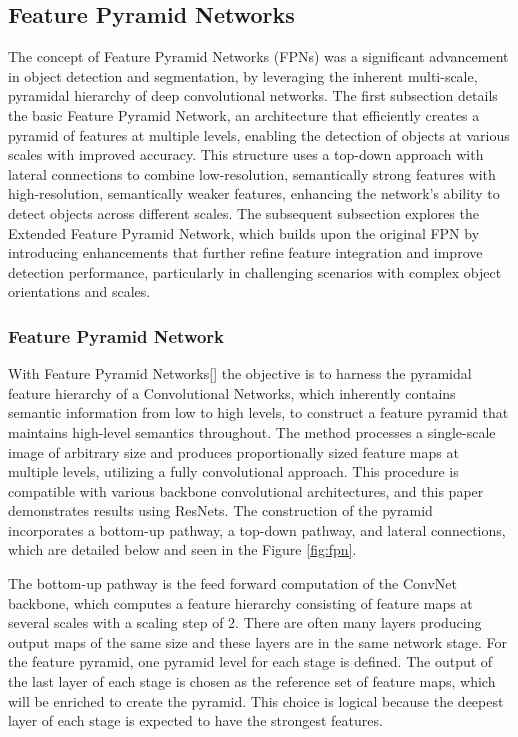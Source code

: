 \subsection{Feature Pyramid Networks}

The concept of Feature Pyramid Networks (FPNs) was a significant advancement in object detection and segmentation, by leveraging the inherent multi-scale, 
pyramidal hierarchy of deep convolutional networks. The first subsection details the basic Feature Pyramid Network, an architecture that efficiently creates 
a pyramid of features at multiple levels, enabling the detection of objects at various scales with improved accuracy. This structure uses a top-down approach 
with lateral connections to combine low-resolution, semantically strong features with high-resolution, semantically weaker features, enhancing the network’s 
ability to detect objects across different scales. The subsequent subsection explores the Extended Feature Pyramid Network, which builds upon the original FPN 
by introducing enhancements that further refine feature integration and improve detection performance, particularly in challenging scenarios with complex object 
orientations and scales.


\subsubsection{Feature Pyramid Network}

With Feature Pyramid Networks[] the objective is to harness the pyramidal feature hierarchy of a Convolutional Networks, which inherently contains semantic 
information from low to high levels, to construct a feature pyramid that maintains high-level semantics throughout. The method processes a single-scale 
image of arbitrary size and produces proportionally sized feature maps at multiple levels, utilizing a fully convolutional approach. This procedure is 
compatible with various backbone convolutional architectures, and this paper demonstrates results using ResNets. The construction of the pyramid incorporates 
a bottom-up pathway, a top-down pathway, and lateral connections, which are detailed below and seen in the Figure \ref{fig:fpn}.

The bottom-up pathway is the feed forward computation of the ConvNet backbone, which computes a feature hierarchy consisting of feature maps at several scales 
with a scaling step of 2. There are often many layers producing output maps of the same size and these layers are in the same network stage. For the 
feature pyramid, one pyramid level for each stage is defined. The output of the last layer of each stage is chosen as the reference set of feature maps, 
which will be enriched to create the pyramid. This choice is logical because the deepest layer of each stage is expected to have the strongest features.

